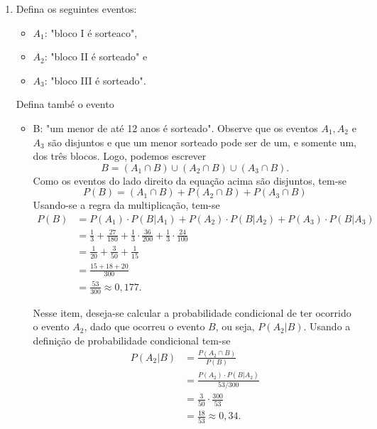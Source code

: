 \documentclass[10 pt,usenames,dvipsnames, oneside]{article}
\begin{document}
\ifdefined\prof
\begin{solucao}

\begin{enumerate}
\item Defina os seguintes eventos:
\begin{itemize}
\item $A_1$: "bloco I é sorteaco",
\item $A_2$: "bloco II é sorteado" e
\item $A_3$: "bloco III é sorteado".
\end{itemize}
Defina també o evento 
\begin{itemize}
\item B: "um menor de até 12 anos é sorteado". Observe que os eventos $A_1,A_2$ e $A_3$ são disjuntos e que um menor sorteado pode ser de um, e somente um, dos três blocos. Logo, podemos escrever
\begin{equation*}
B=(A_1\cap B)\cup(A_2\cap B)\cup(A_3\cap B).
\end{equation*}
Como os eventos do lado direito da equação acima são disjuntos, tem-se\begin{equation*}
P(B)=(A_1\cap B)+P(A_2\cap B)+P(A_3\cap B)
\end{equation*}
Usando-se a regra da multiplicação, tem-se
\begin{align*}
P(B)&=P(A_1)\cdot P(B|A_1)+P(A_2)\cdot P(B|A_2)+P(A_3)\cdot P(B|A_3)\\
&=\frac{1}{3}+\frac{27}{180}+\frac{1}{3}\cdot\frac{36}{200}+\frac{1}{3}\cdot\frac{24}{100}\\
&=\frac{1}{20}+\frac{3}{50}+\frac{1}{15}\\
&=\frac{15+18+20}{300}\\
&=\frac{53}{300}\approx0{,}177.
\end{align*}

Nesse item, deseja-se calcular a probabilidade condicional de ter ocorrido o evento $A_2$, dado que ocorreu o evento $B$, ou seja, $P(A_2|B)$. Usando a definição de probabilidade condicional tem-se
\begin{align*}
P(A_2|B)&=\frac{P(A_2\cap B)}{P(B)}\\
&=\frac{P(A_2)\cdot P(B|A_2)}{53/300}\\
&=\frac{3}{50}\cdot\frac{300}{53}\\
&=\frac{18}{53}\approx0{,}34.
\end{align*}
\end{itemize}
\end{enumerate}

\end{solucao}
\fi
\end{document}
